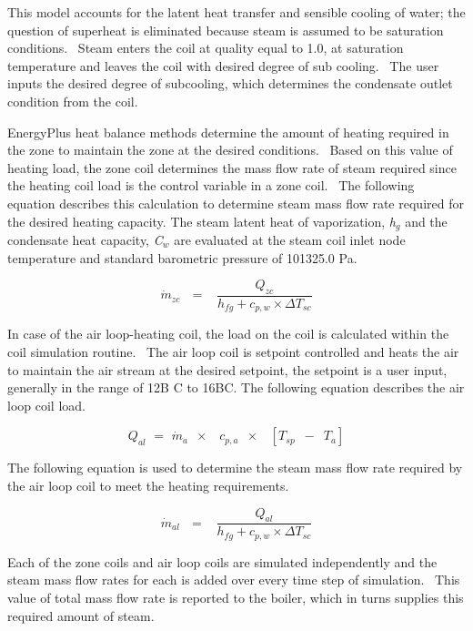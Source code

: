 This model accounts for the latent heat transfer and sensible cooling of water; the question of superheat is eliminated because steam is assumed to be saturation conditions.~ Steam enters the coil at quality equal to 1.0, at saturation temperature and leaves the coil with desired degree of sub cooling.~ The user inputs the desired degree of subcooling, which determines the condensate outlet condition from the coil.

EnergyPlus heat balance methods determine the amount of heating required in the zone to maintain the zone at the desired conditions.~ Based on this value of heating load, the zone coil determines the mass flow rate of steam required since the heating coil load is the control variable in a zone coil.~ The following equation describes this calculation to determine steam mass flow rate required for the desired heating capacity. The steam latent heat of vaporization, \emph{h}\(_{g}\) and the condensate heat capacity, \emph{C}\(_{w}\) are evaluated at the steam coil inlet node temperature and standard barometric pressure of 101325.0 Pa.

\begin{equation}
{\dot m_{zc}}\,\,\,\, = \,\,\,\,\,\frac{{{Q_{zc}}}}{{{h_{fg}} + {c_{p,w}} \times \Delta {T_{sc}}}}
\end{equation}

In case of the air loop-heating coil, the load on the coil is calculated within the coil simulation routine.~ The air loop coil is setpoint controlled and heats the air to maintain the air stream at the desired setpoint, the setpoint is a user input, generally in the range of 12B C to 16BC. The following equation describes the air loop coil load.

\begin{equation}
{Q_{al}}\,\, = \,\,{\dot m_a}\,\,\, \times \,\,\,\,\,{c_{p,a}}\,\,\, \times \,\,\,\,\,\left[ {{T_{sp}}\,\,\, - \,\,\,{T_a}} \right]
\end{equation}

The following equation is used to determine the steam mass flow rate required by the air loop coil to meet the heating requirements.

\begin{equation}
{\dot m_{al}}\,\,\,\, = \,\,\,\,\,\frac{{{Q_{al}}}}{{{h_{fg}} + {c_{p,w}} \times \Delta {T_{sc}}}}
\end{equation}

Each of the zone coils and air loop coils are simulated independently and the steam mass flow rates for each is added over every time step of simulation.~ This value of total mass flow rate is reported to the boiler, which in turns supplies this required amount of steam.

